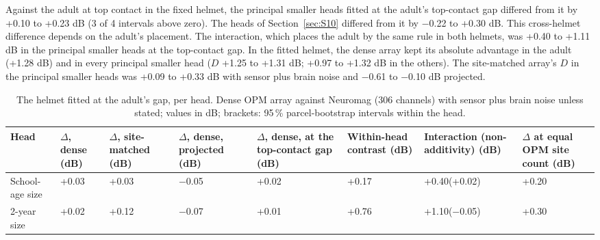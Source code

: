 \documentclass[preprint,12pt,authoryear,a4paper]{elsarticle}
\begin{document}
Against the adult at top contact in the fixed helmet, the principal smaller heads fitted at the adult's top-contact gap differed from it by +0.10 to +0.23 dB (3 of 4 intervals above zero). The heads of Section~\ref{sec:S10} differed from it by −0.22 to +0.30 dB. This cross-helmet difference depends on the adult's placement. The interaction, which places the adult by the same rule in both helmets, was +0.40 to +1.11 dB in the principal smaller heads at the top-contact gap. In the fitted helmet, the dense array kept its absolute advantage in the adult (+1.28 dB) and in every principal smaller head ($D$ +1.25 to +1.31 dB; +0.97 to +1.32 dB in the others). The site-matched array's $D$ in the principal smaller heads was +0.09 to +0.33 dB with sensor plus brain noise and −0.61 to −0.10 dB projected.

\begin{table}
\caption{The helmet fitted at the adult's gap, per head. Dense OPM array against Neuromag (306 channels) with sensor plus brain noise unless stated; values in dB; brackets: 95\,\% parcel-bootstrap intervals within the head.}
\label{tab:S6}
\centering
\footnotesize
\setlength{\tabcolsep}{4pt}\renewcommand{\arraystretch}{0.95}
\begin{tabularx}{\linewidth}{L{2.3cm}YL{1.6cm}YL{1.9cm}YYY}
\toprule
Head & $\Delta$, dense (dB) & $\Delta$, site-matched (dB) & $\Delta$, dense, projected (dB) & $\Delta$, dense, at the top-contact gap (dB) & Within-head contrast (dB) & Interaction (non-additivity) (dB) & $\Delta$ at equal OPM site count (dB) \\
\midrule
School-age size & +0.03\newline [0.00, +0.05] & +0.03 & −0.05\newline [−0.09, 0.00] & +0.02 & +0.17\newline [+0.08, +0.28] & +0.40\newline [+0.30, +0.50]\newline (+0.02) & +0.20\newline [+0.16, +0.24] \\
2-year size & +0.02\newline [−0.02, +0.06] & +0.12 & −0.07\newline [−0.13, −0.02] & +0.01 & +0.76\newline [+0.64, +0.90] & +1.10\newline [+0.97, +1.21]\newline (−0.05) & +0.30\newline [+0.24, +0.35] \\

\end{tabularx}
\end{table}
\end{document}
